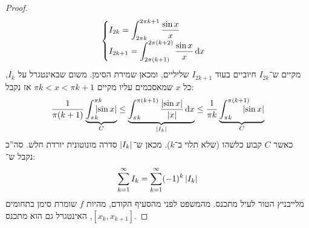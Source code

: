 \documentclass[]{../../../../tex/classes/homework}
\begin{document}
\begin{enumerate}[(A)]
\begin{proof}
\[\begin{cases}
				\displaystyle I_{2k} = \int^{2\pi k + 1}_{2 \pi k}\frac{\sin x}{x} \\
				\displaystyle I_{2k + 1} = \int^{2\pi (k + 2)}_{2 \pi (k + 1)} \frac{\sin x}{x} \,\mathrm{d}x
			\end{cases} \]
			מקיים ש־$I_{2k}$ חיוביים בעוד $I_{2k + 1}$ שליליים, ומכאן שמירת הסימן. משום שבאינטגרל על $I_k$, כל $x$ שמאסכמים עליו מקיים $\pi k < x < \pi k + 1$ אז נקבל: 
			\[ \frac{1}{\pi (k + 1)}\underbrace{\int^{\pi k}_{\pi k}\dequad \sof{\sinx}}_{C} \le \underbrace{\int^{\pi (k + 1)}_{ \pi k}\frac{\sof {\sin x}}{\sof x}\dx}_{\sof{I_k}} \le \frac{1}{\pi k}\underbrace{\int^{\pi (k + 1)}_{\pi k}\dequad \sof{\sin x}}_{C} \]
			כאשר $C$ קבוע כלשהו (שלא תלוי ב־$k$). מכאן ש־$\left \lvert I_k \right \rvert$ סדרה מונוטונית יורדת חלש. 
			סה''כ נקבל ש־: 
			\[ \sum_{k = 1}^{\infty}I_k = \sum_{k = 1}^{\infty}(-1)^{k}\left \lvert I_k \right \rvert \]
			מלייבניץ הטור לעיל מתכנס. מהמשפט לפני מהסעיף הקודם, מהיות $f$ שומרת סימן בתחומים $[x_k, x_{k + 1}]$, האינטגרל גם הוא מתכנס. 
		\end{proof}
	\end{enumerate}
	
\end{document}
